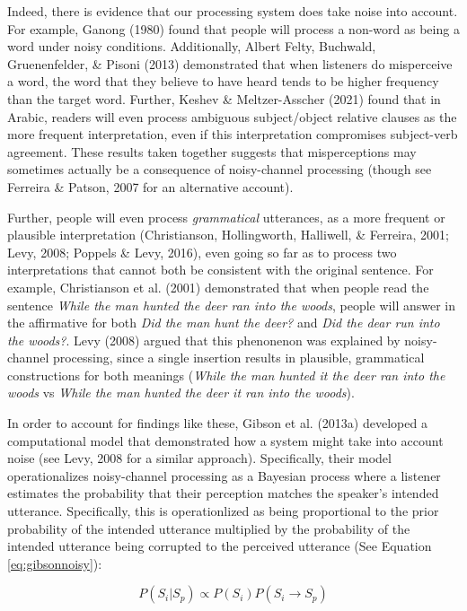 \documentclass[10pt, letterpaper]{article}
\begin{document}
Indeed, there is evidence that our processing system does take noise
into account. For example, Ganong (1980) found that people will process
a non-word as being a word under noisy conditions. Additionally, Albert
Felty, Buchwald, Gruenenfelder, \& Pisoni (2013) demonstrated that when
listeners do misperceive a word, the word that they believe to have
heard tends to be higher frequency than the target word. Further, Keshev
\& Meltzer-Asscher (2021) found that in Arabic, readers will even
process ambiguous subject/object relative clauses as the more frequent
interpretation, even if this interpretation compromises subject-verb
agreement. These results taken together suggests that misperceptions may
sometimes actually be a consequence of noisy-channel processing (though
see Ferreira \& Patson, 2007 for an alternative account).

Further, people will even process \emph{grammatical} utterances, as a
more frequent or plausible interpretation (Christianson, Hollingworth,
Halliwell, \& Ferreira, 2001; Levy, 2008; Poppels \& Levy, 2016), even
going so far as to process two interpretations that cannot both be
consistent with the original sentence. For example, Christianson et al.
(2001) demonstrated that when people read the sentence \emph{While the
man hunted the deer ran into the woods}, people will answer in the
affirmative for both \emph{Did the man hunt the deer?} and \emph{Did the
dear run into the woods?}. Levy (2008) argued that this phenonenon was
explained by noisy-channel processing, since a single insertion results
in plausible, grammatical constructions for both meanings (\emph{While
the man hunted it the deer ran into the woods} vs \emph{While the man
hunted the deer it ran into the woods}).

In order to account for findings like these, Gibson et al. (2013a)
developed a computational model that demonstrated how a system might
take into account noise (see Levy, 2008 for a similar approach).
Specifically, their model operationalizes noisy-channel processing as a
Bayesian process where a listener estimates the probability that their
perception matches the speaker's intended utterance. Specifically, this
is operationlized as being proportional to the prior probability of the
intended utterance multiplied by the probability of the intended
utterance being corrupted to the perceived utterance (See Equation
\ref{eq:gibsonnoisy}):

\begin{equation}
\label{eq:gibsonnoisy}
P(S_i|S_p) \propto P(S_i) P(S_i \to S_p)
\end{equation}
\end{document}
